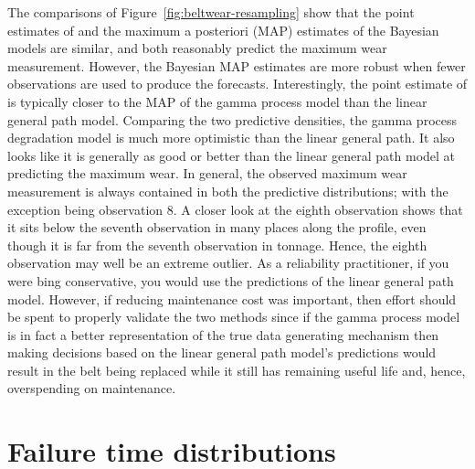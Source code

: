 The comparisons of Figure~\ref{fig:beltwear-resampling} show that the point estimates of \citet{webb_2020} and the maximum a posteriori (MAP) estimates of the Bayesian models are similar, and both reasonably predict the maximum wear measurement. However, the Bayesian MAP estimates are more robust when fewer observations are used to produce the forecasts. Interestingly, the point estimate of \citet{webb_2020} is typically closer to the MAP of the gamma process model than the linear general path model. Comparing the two predictive densities, the gamma process degradation model is much more optimistic than the linear general path. It also looks like it is generally as good or better than the linear general path model at predicting the maximum wear. In general, the observed maximum wear measurement is always contained in both the predictive distributions; with the exception being observation $8$. A closer look at the eighth observation shows that it sits below the seventh observation in many places along the profile, even though it is far from the seventh observation in tonnage. Hence, the eighth observation may well be an extreme outlier. As a reliability practitioner, if you were bing conservative, you would use the predictions of the linear general path model. However, if reducing maintenance cost was important, then effort should be spent to properly validate the two methods since if the gamma process model is in fact a better representation of the true data generating mechanism then making decisions based on the linear general path model's predictions would result in the belt being replaced while it still has remaining useful life and, hence, overspending on maintenance.

\section{Failure time distributions} \label{sec:belt-wear-ft}

